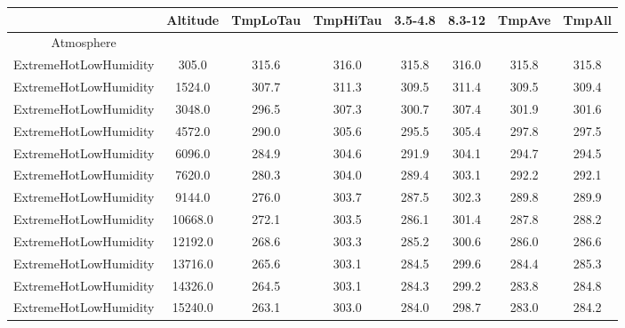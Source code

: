 \documentclass{workpackage}
\begin{document}
\begin{center}

\begin{normalsize}

\begin{tabular}{|c|c|c|c|c|c|c|c|}
\hline
&Altitude&TmpLoTau&TmpHiTau&3.5-4.8&8.3-12&TmpAve&TmpAll\\\hline
Atmosphere&&&&&&&\\\hline
ExtremeHotLowHumidity&305.0&315.6&316.0&315.8&316.0&315.8&315.8\\\hline
ExtremeHotLowHumidity&1524.0&307.7&311.3&309.5&311.4&309.5&309.4\\\hline
ExtremeHotLowHumidity&3048.0&296.5&307.3&300.7&307.4&301.9&301.6\\\hline
ExtremeHotLowHumidity&4572.0&290.0&305.6&295.5&305.4&297.8&297.5\\\hline
ExtremeHotLowHumidity&6096.0&284.9&304.6&291.9&304.1&294.7&294.5\\\hline
ExtremeHotLowHumidity&7620.0&280.3&304.0&289.4&303.1&292.2&292.1\\\hline
ExtremeHotLowHumidity&9144.0&276.0&303.7&287.5&302.3&289.8&289.9\\\hline
ExtremeHotLowHumidity&10668.0&272.1&303.5&286.1&301.4&287.8&288.2\\\hline
ExtremeHotLowHumidity&12192.0&268.6&303.3&285.2&300.6&286.0&286.6\\\hline
ExtremeHotLowHumidity&13716.0&265.6&303.1&284.5&299.6&284.4&285.3\\\hline
ExtremeHotLowHumidity&14326.0&264.5&303.1&284.3&299.2&283.8&284.8\\\hline
ExtremeHotLowHumidity&15240.0&263.1&303.0&284.0&298.7&283.0&284.2\\\hline

\end{tabular}
\end{normalsize}
\end{center}
\end{document}
